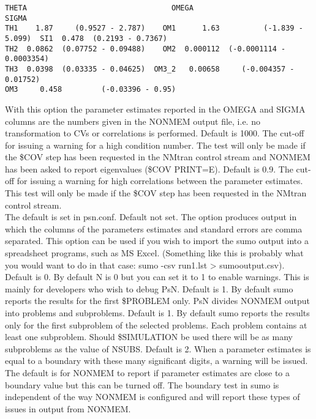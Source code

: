 \begin{optionlist}
\begin{verbatim}
THETA                                 OMEGA                                 SIGMA                     
TH1    1.87     (0.9527 - 2.787)    OM1      1.63          (-1.839 - 5.099)  SI1  0.478  (0.2193 - 0.7367)  
TH2  0.0862  (0.07752 - 0.09488)    OM2  0.000112  (-0.0001114 - 0.0003354)                                 
TH3  0.0398  (0.03335 - 0.04625)  OM3_2   0.00658     (-0.004357 - 0.01752)                                 
OM3     0.458         (-0.03396 - 0.95)
\end{verbatim}
With this option the parameter estimates reported in the OMEGA and SIGMA columns are the numbers given in the NONMEM output file, i.e. no transformation to CVs or correlations is performed. 
\nextopt
{}
Default is 1000. The cut-off for issuing a warning for a high condition number. The test will only be made if the \$COV step has been requested in the NMtran control stream and NONMEM has been asked to report eigenvalues (\$COV PRINT=E).
\nextopt
{}
Default is 0.9. The cut-off for issuing a warning for high correlations between the parameter estimates. This test will only be made if the \$COV step has been requested in the NMtran control stream. \\
The default is set in psn.conf. 
\nextopt
{}
Default not set. The option produces output in which the columns of the parameters estimates and standard errors are comma separated. This option can be used if you wish to import the sumo output into a spreadsheet programs, such as MS Excel. (Something like this is probably what you would want to do in that case: sumo -csv run1.lst > sumooutput.csv). 
\nextopt
{}
Default is 0. By default N is 0 but you can set it to 1 to enable warnings. This is mainly for developers who wish to debug PsN.
\nextopt
{}
Default is 1. By default sumo reports the results for the first \$PROBLEM only. PsN divides NONMEM output into problems and subproblems.
\nextopt
{}
Default is 1. By default sumo reports the results only for the first subproblem of the selected problems. Each problem contains at least one subproblem. Should \$SIMULATION be used there will be as many subproblems as the value of NSUBS. 
\nextopt
\newpage
{}
Default is 2. When a parameter estimates is equal to a boundary with these many significant digits, a warning will be issued. The default is for NONMEM to report if parameter estimates are close to a boundary value but this can be turned off. The boundary test in sumo is independent of the way NONMEM is configured and will report these types of issues in output from NONMEM. 

\end{optionlist}

